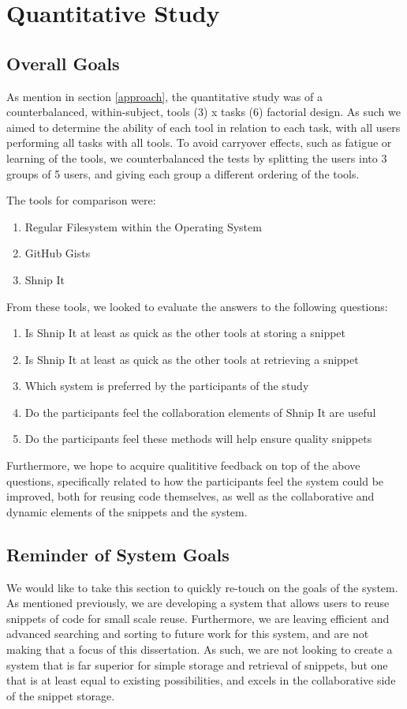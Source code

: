 \section{Quantitative Study} \label{quantitativestudy}
\subsection{Overall Goals} \label{overallgoals}
As mention in section \ref{approach}, the quantitative study was of a counterbalanced, within-subject, tools (3) x tasks (6) factorial design. 
As such we aimed to determine the ability of each tool in relation to each task, with all users performing all tasks with all tools.
To avoid carryover effects, such as fatigue or learning of the tools, we counterbalanced the tests by splitting the users into 3 groups of 5 users, and giving each group a different ordering of the tools.

The tools for comparison were:
\begin{enumerate}
\item Regular Filesystem within the Operating System
\item GitHub Gists
\item Shnip It
\end{enumerate}

From these tools, we looked to evaluate the answers to the following questions:

\begin{enumerate}
\item Is Shnip It at least as quick as the other tools at storing a snippet
\item Is Shnip It at least as quick as the other tools at retrieving a snippet
\item Which system is preferred by the participants of the study
\item Do the participants feel the collaboration elements of Shnip It are useful
\item Do the participants feel these methods will help ensure quality snippets
\end{enumerate}

Furthermore, we hope to acquire qualititive feedback on top of the above questions, specifically related to how the participants feel the system could be improved, both for reusing code themselves, as well as the collaborative and dynamic elements of the snippets and the system.

\subsection{Reminder of System Goals}
We would like to take this section to quickly re-touch on the goals of the system.
As mentioned previously, we are developing a system that allows users to reuse snippets of code for small scale reuse.
Furthermore, we are leaving efficient and advanced searching and sorting to future work for this system, and are not making that a focus of this dissertation.
As such, we are not looking to create a system that is far superior for simple storage and retrieval of snippets, but one that is at least equal to existing possibilities, and excels in the collaborative side of the snippet storage.

